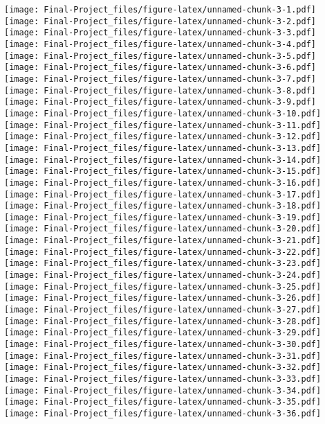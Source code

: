 \documentclass[
]{article}
\begin{document}
\texttt{[image: Final-Project\_files/figure-latex/unnamed-chunk-3-1.pdf]}
\texttt{[image: Final-Project\_files/figure-latex/unnamed-chunk-3-2.pdf]}
\texttt{[image: Final-Project\_files/figure-latex/unnamed-chunk-3-3.pdf]}
\texttt{[image: Final-Project\_files/figure-latex/unnamed-chunk-3-4.pdf]}
\texttt{[image: Final-Project\_files/figure-latex/unnamed-chunk-3-5.pdf]}
\texttt{[image: Final-Project\_files/figure-latex/unnamed-chunk-3-6.pdf]}
\texttt{[image: Final-Project\_files/figure-latex/unnamed-chunk-3-7.pdf]}
\texttt{[image: Final-Project\_files/figure-latex/unnamed-chunk-3-8.pdf]}
\texttt{[image: Final-Project\_files/figure-latex/unnamed-chunk-3-9.pdf]}
\texttt{[image: Final-Project\_files/figure-latex/unnamed-chunk-3-10.pdf]}
\texttt{[image: Final-Project\_files/figure-latex/unnamed-chunk-3-11.pdf]}
\texttt{[image: Final-Project\_files/figure-latex/unnamed-chunk-3-12.pdf]}
\texttt{[image: Final-Project\_files/figure-latex/unnamed-chunk-3-13.pdf]}
\texttt{[image: Final-Project\_files/figure-latex/unnamed-chunk-3-14.pdf]}
\texttt{[image: Final-Project\_files/figure-latex/unnamed-chunk-3-15.pdf]}
\texttt{[image: Final-Project\_files/figure-latex/unnamed-chunk-3-16.pdf]}
\texttt{[image: Final-Project\_files/figure-latex/unnamed-chunk-3-17.pdf]}
\texttt{[image: Final-Project\_files/figure-latex/unnamed-chunk-3-18.pdf]}
\texttt{[image: Final-Project\_files/figure-latex/unnamed-chunk-3-19.pdf]}
\texttt{[image: Final-Project\_files/figure-latex/unnamed-chunk-3-20.pdf]}
\texttt{[image: Final-Project\_files/figure-latex/unnamed-chunk-3-21.pdf]}
\texttt{[image: Final-Project\_files/figure-latex/unnamed-chunk-3-22.pdf]}
\texttt{[image: Final-Project\_files/figure-latex/unnamed-chunk-3-23.pdf]}
\texttt{[image: Final-Project\_files/figure-latex/unnamed-chunk-3-24.pdf]}
\texttt{[image: Final-Project\_files/figure-latex/unnamed-chunk-3-25.pdf]}
\texttt{[image: Final-Project\_files/figure-latex/unnamed-chunk-3-26.pdf]}
\texttt{[image: Final-Project\_files/figure-latex/unnamed-chunk-3-27.pdf]}
\texttt{[image: Final-Project\_files/figure-latex/unnamed-chunk-3-28.pdf]}
\texttt{[image: Final-Project\_files/figure-latex/unnamed-chunk-3-29.pdf]}
\texttt{[image: Final-Project\_files/figure-latex/unnamed-chunk-3-30.pdf]}
\texttt{[image: Final-Project\_files/figure-latex/unnamed-chunk-3-31.pdf]}
\texttt{[image: Final-Project\_files/figure-latex/unnamed-chunk-3-32.pdf]}
\texttt{[image: Final-Project\_files/figure-latex/unnamed-chunk-3-33.pdf]}
\texttt{[image: Final-Project\_files/figure-latex/unnamed-chunk-3-34.pdf]}
\texttt{[image: Final-Project\_files/figure-latex/unnamed-chunk-3-35.pdf]}
\texttt{[image: Final-Project\_files/figure-latex/unnamed-chunk-3-36.pdf]}
\end{document}
